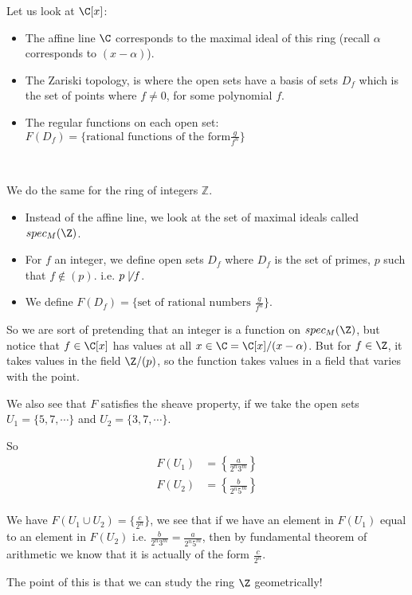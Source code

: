 \begin{example}[]
    Let us look at $\C[x]$: 
\begin{itemize}
    \item The affine line $\C$ corresponds to the maximal ideal of this ring (recall $\alpha$ corresponds to  $(x-\alpha)$).
    \item The Zariski topology, is where the open sets have a basis of sets $D_f$ which is the set of points where $f\neq 0$, for some polynomial $f$. 
    \item The regular functions on each open set: $F(D_f) = \{\text{rational functions of the form} \frac{g}{f^n}\}$
\end{itemize}
    
    

    \

    We do the same for the ring of integers $\mathbb{Z}$. 

\begin{itemize}
    \item Instead of the affine line, we look at the set of maximal ideals called $spec_M(\Z)$.
    \item For $f$ an integer, we define open sets $D_f$ where $D_f$ is the set of primes, $p$ such that $f\not\in (p)$. i.e. $p\not\mid f$.
    \item We define $F(D_f) = \{\text{set of rational numbers } \frac{g}{f^n} \}$. 
\end{itemize}

So we are sort of pretending that an integer is a function on $spec_M(\Z)$, but notice that $f\in \C[x]$ has values at all $x\in \C = \C[x]/(x-\alpha)$. But for $f\in \Z$, it takes values in the field $\Z/(p)$, so the function takes values in a field that varies with the point. 

We also see that $F$ satisfies the sheave property, if we take the open sets $U_1 = \{5,7,\cdots\}$ and $U_2 = \{3,7,\cdots\}$.

So \begin{align*}
    F(U_1) &= \left\{ \frac{a}{2^n3^m} \right\}\\
    F(U_2) &= \left\{ \frac{b}{2^n5^m} \right\}\\   
\end{align*}

We have $F(U_1\cup U_2) = \{ \frac{c}{2^n} \}$, we see that if we have an element in $F(U_1)$ equal to an element in $F(U_2)$ i.e. $\frac{b}{2^n3^m} = \frac{a}{2^n5^m}$, then by fundamental theorem of arithmetic we know that it is actually of the form $\frac{c}{2^n}$.

The point of this is that we can study the ring $\Z$ geometrically!
\end{example}

